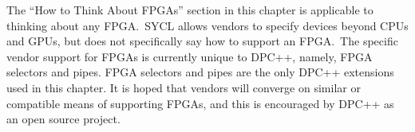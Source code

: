 The “How to Think About FPGAs” section in this chapter is applicable to thinking about any FPGA. SYCL allows vendors to specify devices beyond CPUs and GPUs, but does not specifically say how to support an FPGA. The specific vendor support for FPGAs is currently unique to DPC++, namely, FPGA selectors and pipes. FPGA selectors and pipes are the only DPC++ extensions used in this chapter. It is hoped that vendors will converge on similar or compatible means of supporting FPGAs, and this is encouraged by DPC++ as an open source project.\par






















































